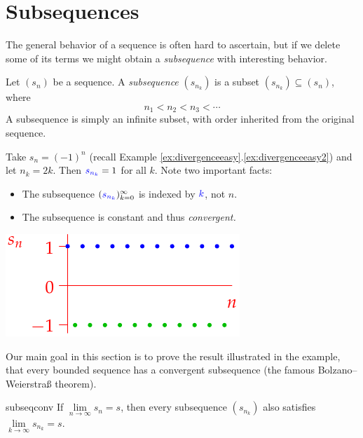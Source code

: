 \section{Subsequences}\label{sec:subseq}

The general behavior of a sequence is often hard to ascertain, but if we delete some of its terms we might obtain a \emph{subsequence} with interesting behavior.

\begin{defn}{}{}
	Let $(s_n)$ be a sequence. A \emph{subsequence} $(s_{n_k})$ is a subset $(s_{n_k})\subseteq (s_n)$, where 
	\[n_1<n_2<n_3<\cdots\]
	A subsequence is simply an infinite subset, with order inherited from the original sequence.
\end{defn}

\begin{example}[lower separated=false, sidebyside, sidebyside align=top seam, sidebyside gap=0pt, righthand width=0.38\linewidth]{}{}
	Take $s_n=(-1)^n$ (recall Example \ref*{ex:divergenceeasy}.\ref{ex:divergenceeasy2}) and let $n_k=2k$. Then $\textcolor{blue}{s_{n_k}}=1$ for all $k$. Note two important facts:
	\begin{itemize}
	  \item The subsequence $(\textcolor{blue}{s_{n_k}})_{k=0}^\infty$ is indexed by $\textcolor{blue}{k}$, not $n$.
	  \item The subsequence is constant and thus \emph{convergent.}
	\end{itemize} 
	\tcblower
	\hfill\includegraphics{divergent3}
\end{example}

Our main goal in this section is to prove the result illustrated in the example, that every bounded sequence has a convergent subsequence (the famous Bolzano--Weierstraß theorem).


\begin{lemm}{}{subseqconv}
	If $\lim\limits_{n\to\infty} s_n=s$, then every subsequence $(s_{n_k})$ also satisfies $\lim\limits_{k\to\infty} s_{n_k}=s$.\vspace{-3pt}
\end{lemm}

